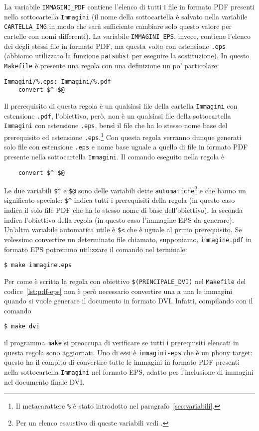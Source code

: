 La variabile \texttt{IMMAGINI\_PDF} contiene l'elenco di tutti i file in formato
\textsc{PDF} presenti nella sottocartella \texttt{Immagini} (il nome della
sottocartella è salvato nella variabile \texttt{CARTELLA\_IMG} in modo che sarà
sufficiente cambiare solo questo valore per cartelle con nomi differenti).  La
variabile \texttt{IMMAGINI\_EPS}, invece, contiene l'elenco dei degli stessi
file in formato \textsc{PDF}, ma questa volta con estensione \texttt{.eps}
(abbiamo utilizzato la funzione \texttt{patsubst} per eseguire la sostituzione).
In questo \texttt{Makefile} è presente una regola con una definizione un po'
particolare:
\begin{lstlisting}
Immagini/%.eps: Immagini/%.pdf
	convert $^ $@
\end{lstlisting}
Il prerequisito di questa regola è un qualsiasi file della cartella
\texttt{Immagini} con estensione \texttt{.pdf}, l'obiettivo, però, non è un
qualsiasi file della sottocartella \texttt{Immagini} con estensione
\texttt{.eps}, bensì il file che ha lo stesso nome base del prerequisito ed
estensione
\texttt{.eps}.\footnote{Il metacarattere \texttt{\%} è stato introdotto nel
  paragrafo~\ref{sec:variabili}.}
Con questa regola verranno dunque generati solo file con estensione
\texttt{.eps} e nome base uguale a quello di file in formato \textsc{PDF}
presente nella sottocartella \texttt{Immagini}.  Il comando eseguito nella
regola è
\begin{lstlisting}
	convert $^ $@
\end{lstlisting}
Le due variabili \texttt{\$\^} e \texttt{\$@} sono delle variabili dette
\texttt{automatiche}\footnote{Per un elenco esaustivo di queste variabili vedi
  \cite[pagina 112]{gnu:make}.}
e che hanno un significato speciale: \texttt{\$\^} indica tutti i prerequisiti
della regola (in questo caso indica il solo file \textsc{PDF} che ha lo stesso
nome di base dell'obiettivo), la seconda indica l'obiettivo della regola (in
questo caso l'immagine \textsc{EPS} da generare).  Un'altra variabile automatica
utile è \texttt{\$<} che è uguale al primo prerequisito.  Se volessimo
convertire un determinato file chiamato, supponiamo, \texttt{immagine.pdf} in
formato \textsc{EPS} potremmo utilizzare il comando nel terminale:
\begin{verbatim}
$ make immagine.eps
\end{verbatim}
Per come è scritta la regola con obiettivo \texttt{\$(PRINCIPALE\_DVI)} nel
\texttt{Makefile} del codice~\ref{lst:pdf-eps} non è però necessario convertire
una a una le immagini quando si vuole generare il documento in formato
\textsc{DVI}.  Infatti, compilando con il comando
\begin{verbatim}
$ make dvi
\end{verbatim}
il programma \texttt{make} si preoccupa di verificare se tutti i prerequisiti
elencati in questa regola sono aggiornati.  Uno di essi è \texttt{immagini-eps}
che è un phony target: questo ha il compito di convertire tutte le immagini in
formato \textsc{PDF} presenti nella sottocartella \texttt{Immagini} nel formato
\textsc{EPS}, adatto per l'inclusione di immagini nel documento finale
\textsc{DVI}.

